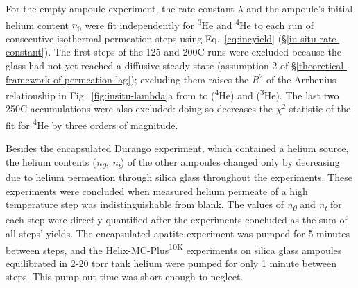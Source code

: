 For the empty ampoule experiment, the rate constant \(\lambda\) and the ampoule's initial helium content \(n_{0}\) were fit independently for \textsuperscript{3}He and \textsuperscript{4}He to each run of consecutive isothermal permeation steps using Eq.~\eqref{eq:incyield} (\S\ref{in-situ-rate-constant}). The first steps of the 125 and 200\textdegree C runs were excluded because the glass had not yet reached a diffusive steady state (assumption 2 of \S\ref{theoretical-framework-of-permeation-lag}); excluding them raises the \(R^{2}\) of the Arrhenius relationship in Fig.~\ref{fig:insitu-lambda}a from \PaperArrRtwoAllFourHe{} to \PaperArrRtwoFourHe{} (\textsuperscript{4}He) and \PaperArrRtwoThreeHe{} (\textsuperscript{3}He). The last two 250\textdegree C accumulations were also excluded: doing so decreases the $\chi^2$ statistic of the fit for \textsuperscript{4}He by three orders of magnitude. 

Besides the encapsulated Durango experiment, which contained a helium source, the helium contents (\emph{n\textsubscript{0}, n\textsubscript{t}}) of the other ampoules changed only by decreasing due to helium permeation through silica glass throughout the experiments. These experiments were concluded when measured helium permeate of a high temperature step was indistinguishable from blank. The values of \emph{n\textsubscript{0}} and \emph{n\textsubscript{t}} for each step were directly quantified after the experiments concluded as the sum of all steps' yields. The encapsulated apatite experiment was pumped for 5 minutes between steps, and the Helix-MC-Plus\textsuperscript{10K} experiments on silica glass ampoules equilibrated in 2-20 torr tank helium were pumped for only 1 minute between steps. This pump-out time was short enough to neglect.

